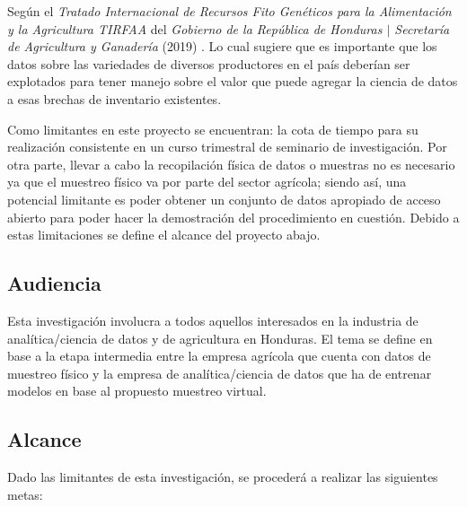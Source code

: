 \documentclass[conference]{IEEEtran}
\begin{document}
\bigbreak

Según el \textit{Tratado Internacional de  Recursos Fito Genéticos  para la Alimentación y la Agricultura  TIRFAA} del \textit{Gobierno de la República de Honduras $\mid$ Secretaría de Agricultura y Ganadería} (2019) \cite{santacreo-2019} . Lo cual sugiere que es importante que los datos sobre las variedades de diversos productores en el país deberían ser explotados para tener manejo sobre el valor que puede agregar la ciencia de datos a esas brechas de inventario existentes.

\bigbreak

Como limitantes en este proyecto se encuentran: la cota de tiempo para su realización consistente en un curso trimestral de seminario de investigación. Por otra parte, llevar a cabo la recopilación física de datos o muestras no es necesario ya que el muestreo físico va por parte del sector agrícola; siendo así, una potencial limitante es poder obtener un conjunto de datos apropiado de acceso abierto para poder hacer la demostración del procedimiento en cuestión. Debido a estas limitaciones se define el alcance del proyecto abajo.

\subsection{Audiencia}

Esta investigación involucra a todos aquellos interesados en la industria de analítica/ciencia de datos y de agricultura en Honduras. El tema se define en base a la etapa intermedia entre la empresa agrícola que cuenta con datos de muestreo físico y la empresa de analítica/ciencia de datos que ha de entrenar modelos en base al propuesto muestreo virtual.

\subsection{Alcance}

Dado las limitantes de esta investigación, se procederá a realizar las siguientes metas:
\end{document}
